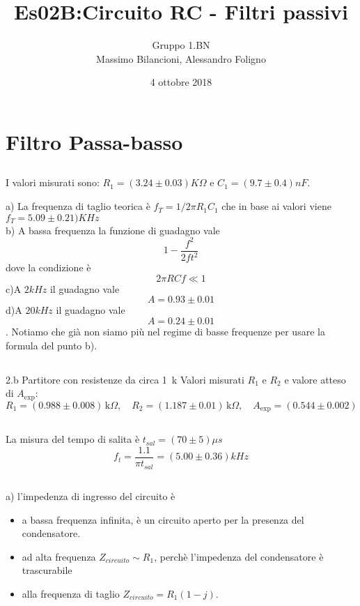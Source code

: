 \documentclass[10pt,a4paper]{article}
\author{Gruppo 1.BN \\ Massimo Bilancioni, Alessandro Foligno }
\title{Es02B:Circuito RC - Filtri passivi}
\begin{document}
\date{4 ottobre 2018}
\maketitle


\section{Filtro Passa-basso}
\subsection{}

I valori misurati sono: $R_1  = (3.24\pm 0.03 )K\Omega$ e  $C_1  = (9.7\pm 0.4 )nF$.

a) La frequenza di taglio teorica è  $f_T = 1/2\pi R_1 C_1$ che in base ai valori viene $f_T = 5.09\pm 0.21)KHz$\\
b) A bassa frequenza la funzione di guadagno vale \[1-\frac{f^2}{2ft^2}\] dove la condizione è \[2\pi RCf\ll1\]
c)A $2kHz$ il guadagno vale \[A=0.93\pm0.01\]
d)A $20kHz$ il guadagno vale \[A=0.24\pm0.01\]. Notiamo che già non siamo più nel regime di basse frequenze per usare la formula del punto b).
\subsection{}{2.b Partitore con resistenze da circa 1~k}
Valori misurati $R_1$ e $R_2$ e valore atteso di $A_\mathrm{exp}$:
\[
R_1 = (0.988  \pm0.008  ) \,\mathrm{k}\Omega, \quad
R_2 = (1.187 \pm 0.01 ) \,\mathrm{k}\Omega, \quad
A_\mathrm{exp} = ( 0.544 \pm 0.002 ) 
\]




\subsection{}

La misura del tempo di salita è $ t_{sal} = (70\pm 5)\mu s$
\[ f_t = \frac{1.1}{\pi t_{sal}} = (5.00 \pm 0.36) kHz \]

\subsection{}
a) l'impedenza di ingresso del circuito è
\begin{itemize}

\item a bassa frequenza  infinita, è un circuito aperto per la presenza del condensatore.
\item ad alta frequenza $Z_{circuito}\sim R_1$, perchè l'impedenza del condensatore è trascurabile
\item alla frequenza di taglio  $Z_{circuito} = R_1(1-j)$.

\end{itemize}
\end{document}
